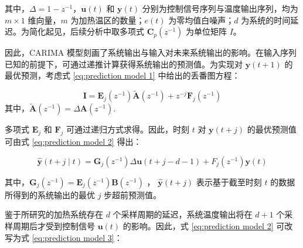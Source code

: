 其中，$ \Delta = 1 - z^{-1} $，$\boldsymbol{u}(t)$ 和 $\boldsymbol{y}(t)$ 分别为控制信号序列与温度输出序列，均为 $m \times 1$ 维向量，$m$ 为加热温区的数量；$e(t)$ 为零均值白噪声；$d$ 为系统的时间延迟。为简化起见，后续分析中取多项式 $\boldsymbol{C}_p\left(z^{-1}\right)$ 为单位矩阵 $I$。\par

因此，CARIMA 模型刻画了系统输出与输入对未来系统输出的影响。在输入序列已知的前提下，可通过递推计算获得系统输出的预测值。为实现对 $\boldsymbol{y}(t+1)$ 的最优预测，考虑式 \ref{eq:prediction model 1} 中给出的丢番图方程：\par

\begin{equation}
    \boldsymbol{I}=\boldsymbol{E}_{j}\left(z^{-1}\right) \tilde{\boldsymbol{A}}\left(z^{-1}\right)+z^{-j} \boldsymbol{F}_{j}\left(z^{-1}\right)
    \label{eq:prediction model 1}
\end{equation}
其中，$\tilde{\boldsymbol{A}}\left(z^{-1}\right)=\Delta \boldsymbol{A}\left(z^{-1}\right)$.\par

多项式 $\boldsymbol{E}_j$ 和 $\boldsymbol{F}_j$ 可通过递归方式求得。因此，时刻 $t$ 对 $\boldsymbol{y}(t+j)$ 的最优预测值可由式 \ref{eq:prediction model 2} 得出：

\begin{equation}
    \hat{\boldsymbol{y}}(t+j \mid t) = \boldsymbol{G}_{j}\left(z^{-1}\right) \Delta \boldsymbol{u}(t+j-d-1)+F_{j}\left(z^{-1}\right) \boldsymbol{y}(t)
    \label{eq:prediction model 2}
\end{equation}

其中，$\boldsymbol{G}_j\left(z^{-1}\right) = \boldsymbol{E}_j\left(z^{-1}\right) \boldsymbol{B}\left(z^{-1}\right)$ ， $\hat{\boldsymbol{y}}(t+j)$ 表示基于截至时刻 $t$ 的数据所得到的系统输出的最优 $j$ 步超前预测值。\par

鉴于所研究的加热系统存在 $d$ 个采样周期的延迟，系统温度输出将在 $d+1$ 个采样周期后才受到控制信号 $\boldsymbol{u}(t)$ 的影响。因此，式 \ref{eq:prediction model 2} 可改写为式 \ref{eq:prediction model 3}：\par


